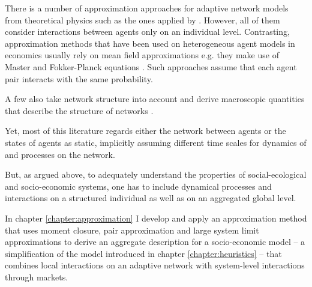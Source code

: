 There is a number of approximation approaches for adaptive network models from theoretical physics such as the ones applied by \cite{Rogers2013, Wiedermann2015, Min2017}. However, all of them consider interactions between agents only on an individual level. Contrasting, approximation methods that have been used on heterogeneous agent models in economics usually rely on mean field approximations e.g. they make use of Master and Fokker-Planck equations \citep{Aoki1998, Aoki2007, DelliGatti2000, DiGuilmi2008, Chiarella2011a, Landini2014}. Such approaches assume that each agent pair interacts with the same probability.

A few also take network structure into account and derive macroscopic quantities that describe the structure of networks \citep[e.g.][]{Alfarano2008a, Lux2016}.

Yet, most of this literature regards either the network between agents or the states of agents as static, implicitly assuming different time scales for dynamics of and processes on the network.

But, as argued above, to adequately understand the properties of social-ecological and socio-economic systems, one has to include dynamical processes and interactions on a structured individual as well as on an aggregated global level.

In chapter \ref{chapter:approximation} I develop and apply an approximation method that uses moment closure, pair approximation and large system limit approximations to derive an aggregate description for a socio-economic model -- a simplification of the model introduced in chapter \ref{chapter:heuristics} -- that combines local interactions on an adaptive network with system-level interactions through markets. 

